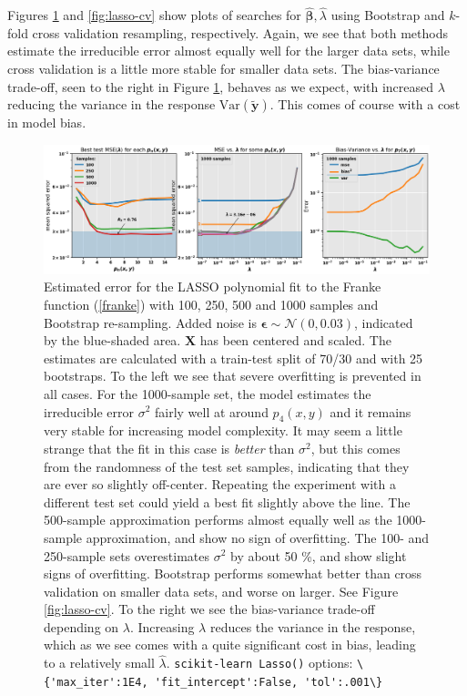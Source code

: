 \documentclass[]{article}
\begin{document}
Figures \ref{fig:lasso-bootstrap} and \ref{fig:lasso-cv} show plots of searches for $\mathbf{\hat{\beta}}, \hat{\lambda}$ using Bootstrap and $k$-fold cross validation resampling, respectively. Again, we see that both methods estimate the irreducible error almost equally well for the larger data sets, while cross validation is a little more stable for smaller data sets. The bias-variance trade-off, seen to the right in Figure \ref{fig:lasso-bootstrap}, behaves as we expect, with increased $\lambda$ reducing the variance in the response $\mathrm{Var}(\mathbf{\tilde{y}})$. This comes of course with a cost in model bias.

\begin{figure}[!htb]
	\centering
	\includegraphics[width=1\linewidth]{./results/lasso-bootstrap.png}
	\caption{Estimated error for the LASSO polynomial fit to the Franke function (\ref{franke}) with 100, 250, 500 and 1000 samples and Bootstrap re-sampling. Added noise is $\mathbf{\epsilon} \sim \mathcal{N}(0, 0.03)$, indicated by the blue-shaded area. $\mathbf{X}$ has been centered and scaled. The estimates are calculated with a train-test split of 70/30 and with 25 bootstraps. To the left we see that severe overfitting is prevented in all cases. For the 1000-sample set, the model estimates the irreducible error $\sigma^2$ fairly well at around $p_4(x,y)$ and it remains very stable for increasing model complexity. It may seem a little strange that the fit in this case is \textit{better} than $\sigma^2$, but this comes from the randomness of the test set samples, indicating that they are ever so slightly off-center. Repeating the experiment with a different test set could yield a best fit slightly above the line. The 500-sample approximation performs almost equally well as the 1000-sample approximation, and show no sign of overfitting. The 100- and 250-sample sets overestimates $\sigma^2$ by about 50 \%, and show slight signs of overfitting. Bootstrap performs somewhat better than cross validation on smaller data sets, and worse on larger. See Figure \ref{fig:lasso-cv}. To the right we see the bias-variance trade-off depending on $\lambda$. Increasing $\lambda$ reduces the variance in the response, which as we see comes with a quite significant cost in bias, leading to a relatively small $\hat{\lambda}$. \lstinline|scikit-learn Lasso()| options: \lstinline|\{'max_iter':1E4, 'fit_intercept':False, 'tol':.001\}|}
	\label{fig:lasso-bootstrap}
\end{figure}
\end{document}
